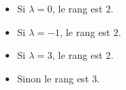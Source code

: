 \begin{itemize}
 \item Si $\lambda=0$, le rang est $2$.
\item Si $\lambda=-1$, le rang est $2$.
\item Si $\lambda=3$, le rang est $2$.
\item Sinon le rang est $3$.
\end{itemize}
